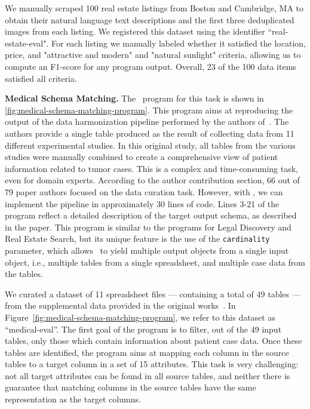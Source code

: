 We manually scraped 100 real estate listings from Boston and Cambridge, MA to obtain their natural language text descriptions and the first three deduplicated images from each listing.  We registered this dataset using the identifier ``real-estate-eval".  For each listing we manually labeled whether it satisfied the location, price, and "attractive and modern" and "natural sunlight" criteria, allowing us to compute an F1-score for any program output. Overall, 23 of the 100 data items satisfied all criteria.


{\bf Medical Schema Matching.} The \system\ program for this task is shown in \autoref{fig:medical-schema-matching-program}. This program aims at reproducing the output of the data harmonization pipeline performed by the authors of~\cite{li2023proteogenomic}.
The authors provide a single table produced as the result of collecting data from 11 different experimental studies. In this original study, all tables from the various studies were manually combined to create a comprehensive view of patient information related to tumor cases. This is a complex and time-consuming task, even for domain experts. According to the author contribution section, 66 out of 79 paper authors focused on the data curation task. However, with \system, we can implement the pipeline in approximately 30 lines of code. Lines 3-21 of the program reflect a detailed description of the target output schema, as described in the paper. This program is similar to the programs for Legal Discovery and Real Estate Search, but its unique feature is the use of the {\tt cardinality} parameter, which allows \system\ to yield multiple output objects from a single input object, i.e., multiple tables from a single spreadsheet, and multiple case data from the tables.

We curated a dataset of 11 spreadsheet files --- containing a total of 49 tables --- from the supplemental data provided in the original works~\cite{Cao_2021, Clark_2019, Dou_2020, Huang_2021, Li_2023, Gillette_2020, Krug_2020, McDermott_2020, Satpathy_2021, Vasaikar_2019,Wang_2021}. 
In Figure~\ref{fig:medical-schema-matching-program}, we refer to this dataset as ``medical-eval''. The first goal of the program is to filter, out of the 49 input tables, only those which contain information about patient case data. Once these tables are identified, the program aims at mapping each column in the source tables to a target column in a set of 15 attributes. This task is very challenging: not all target attributes can be found in all source tables, and neither there is guarantee that matching columns in the source tables have the same representation as the target columns.

